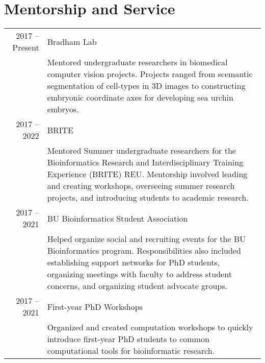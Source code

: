 \documentclass[a4paper,10pt]{report}
\begin{document}
\section{\color{linkcolour} Mentorship and Service}
\begin{longtable}{rp{10cm}}
	2017 -- Present
	 & Bradham Lab                                                                                                                                              \\
	 & \footnotesize{Mentored undergraduate researchers in biomedical computer vision projects. Projects ranged from scemantic segmentation of cell-types in 3D
		images to constructing embryonic coordinate axes for developing
	sea urchin embryos.}                                                                                                                                        \\
	2017 -- 2022
	 & BRITE                                                                                                                                                    \\
	 & \footnotesize{Mentored Summer undergraduate researchers for the
		Bioinformatics Research and Interdisciplinary Training Experience (BRITE)
		REU. Mentorship involved leading and creating workshops, overseeing
	summer research projects, and introducing students to academic research.}                                                                                   \\
	2017 -- 2021
	 & BU Bioinformatics Student Association                                                                                                                    \\
	 & \footnotesize{Helped organize social and recruiting events for the BU
		Bioinformatics program. Responsibilities also included establishing
		support networks for PhD students, organizing meetings with faculty to
	address student concerns, and organizing student advocate groups.}                                                                                          \\
	2017 -- 2021
	 & First-year PhD Workshops                                                                                                                                 \\
	 & \footnotesize{Organized and created computation workshops to quickly
		introduce first-year PhD students to common computational
	tools for bioinformatic research.}                                                                                                                          \\

\end{longtable}
\end{document}
